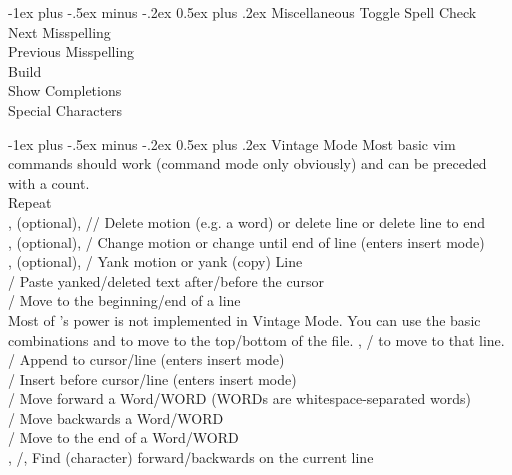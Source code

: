 \documentclass[10pt,landscape]{article}
\makeatletter
\renewcommand{\section}{\@startsection{section}{1}{0mm}%
                                {-1ex plus -.5ex minus -.2ex}%
                                {0.5ex plus .2ex}%
                                {\normalfont\large\bfseries}}
\makeatother
\begin{document}
\begin{multicols}{3}
\section{Miscellaneous}
 Toggle Spell Check \\
\keys{\ctrl}  Next Misspelling \\
\keys{\ctrl} \keys{\shift }  Previous Misspelling \\
\keys{\cmd}  Build \\
\keys{\ctrl} \keys{\space} Show Completions \\
\keys{\cmd} \keys{\Alt}  Special Characters

\section{Vintage Mode}
Most basic vim commands should work (command mode only obviously) and can be preceded with a count. \\
 Repeat \\
,  (optional), // Delete motion (e.g. a word) or delete line or delete line to end  \\
,  (optional), / Change motion or change until end of line (enters insert mode) \\
,  (optional), / Yank motion or yank (copy) Line \\
/ Paste yanked/deleted text after/before the cursor \\
/\keys{\$} Move to the beginning/end of a line \\
 Most of 's power is not implemented in Vintage Mode. You can use the basic combinations  and  to move to the top/bottom of the file. , / to move to that line. \\
/ Append to cursor/line (enters insert mode) \\
/ Insert before cursor/line (enters insert mode) \\
/ Move forward a Word/WORD (WORDs are whitespace-separated words) \\
/ Move backwards a Word/WORD \\
/ Move to the end of a Word/WORD \\
, /,  Find (character) forward/backwards on the current line \\

\end{multicols}
\end{document}
